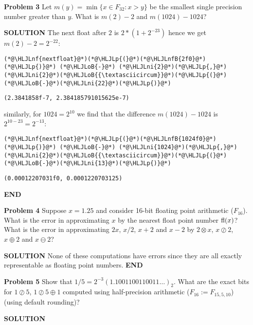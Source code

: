\documentclass[12pt,a4paper]{article}
\newcommand{\HLJLnf}[1]{\textcolor[RGB]{66,102,213}{#1}}
\newcommand{\HLJLnfB}[1]{\textcolor[RGB]{59,151,46}{#1}}
\newcommand{\HLJLni}[1]{\textcolor[RGB]{59,151,46}{#1}}
\newcommand{\HLJLoB}[1]{\textcolor[RGB]{102,102,102}{\textbf{#1}}}
\newcommand{\HLJLp}[1]{#1}
\begin{document}
\textbf{Problem 3} Let $m(y) = \min\{x \in F_{32} : x > y \}$ be the smallest single precision number greater than $y$. What is $m(2) - 2$ and $m(1024) - 1024$? 

\textbf{SOLUTION} The next float after $2$ is $2 * (1 + 2^{-23})$ hence we get $m(2) - 2 = 2^{-22}$:


\begin{lstlisting}
(*@\HLJLnf{nextfloat}@*)(*@\HLJLp{(}@*)(*@\HLJLnfB{2f0}@*)(*@\HLJLp{)}@*) (*@\HLJLoB{-}@*) (*@\HLJLni{2}@*)(*@\HLJLp{,}@*) (*@\HLJLni{2}@*)(*@\HLJLoB{{\textasciicircum}}@*)(*@\HLJLp{(}@*)(*@\HLJLoB{-}@*)(*@\HLJLni{22}@*)(*@\HLJLp{)}@*)
\end{lstlisting}

\begin{lstlisting}
(2.3841858f-7, 2.384185791015625e-7)
\end{lstlisting}


similarly, for $1024 = 2^{10}$ we find that the difference $m(1024) - 1024$ is $2^{10-23} = 2^{-13}$:


\begin{lstlisting}
(*@\HLJLnf{nextfloat}@*)(*@\HLJLp{(}@*)(*@\HLJLnfB{1024f0}@*)(*@\HLJLp{)}@*) (*@\HLJLoB{-}@*) (*@\HLJLni{1024}@*)(*@\HLJLp{,}@*) (*@\HLJLni{2}@*)(*@\HLJLoB{{\textasciicircum}}@*)(*@\HLJLp{(}@*)(*@\HLJLoB{-}@*)(*@\HLJLni{13}@*)(*@\HLJLp{)}@*)
\end{lstlisting}

\begin{lstlisting}
(0.00012207031f0, 0.0001220703125)
\end{lstlisting}


\textbf{END}

\textbf{Problem 4} Suppose $x = 1.25$ and consider 16-bit floating point arithmetic ($F_{16}$). What is the error in approximating $x$ by the nearest float point number ${\rm fl}(x)$? What is the error in approximating $2x$, $x/2$, $x + 2$ and $x - 2$ by $2 \otimes x$, $x \oslash 2$, $x \ensuremath{\oplus} 2$ and $x \ominus 2$?

\textbf{SOLUTION} None of these computations have errors since they are all exactly representable as floating point numbers. \textbf{END}

\textbf{Problem 5} Show that $1/5 = 2^{-3} (1.1001100110011\ensuremath{\ldots})_2$. What are the exact bits for $1 \ensuremath{\oslash} 5$, $1 \ensuremath{\oslash} 5 \ensuremath{\oplus} 1$ computed using  half-precision arithmetic ($F_{16} := F_{15,5,10}$) (using default rounding)?

\textbf{SOLUTION}
\end{document}
